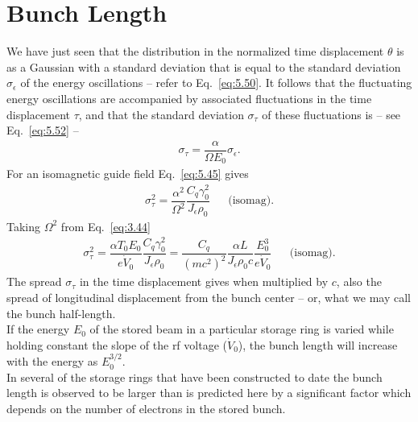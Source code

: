 \section{Bunch Length}\label{sec:5.4}

We have just seen that the distribution in the normalized time displacement $\theta$ is as a Gaussian with a standard deviation that is equal to the standard deviation $\sigma_\epsilon$ of the energy oscillations -- refer to Eq.~\eqref{eq:5.50}. It follows that the fluctuating energy oscillations are accompanied by associated fluctuations in the time displacement $\tau$, and that the standard deviation $\sigma_\tau$ of these fluctuations is -- see Eq.~\eqref{eq:5.52} --
\begin{align}
	\sigma_\tau = \dfrac{\alpha}{\Omega E_0} \sigma_\epsilon.
\end{align}
For an isomagnetic guide field Eq.~\eqref{eq:5.45} gives
\begin{align}
	\sigma_\tau^2 = \dfrac{\alpha^2}{\Omega^2} \dfrac{C_q \gamma_0^2}{J_\epsilon \rho_0} && \text{(isomag).}
\end{align}
Taking $\Omega^2$ from Eq.~\eqref{eq:3.44}
\begin{align}
	\sigma_\tau^2 = \dfrac{\alpha T_0 E_0}{e\dot{V}_0} \dfrac{C_q \gamma_0^2}{J_\epsilon \rho_0} = \dfrac{C_q}{(mc^2)^2} \dfrac{\alpha L}{J_\epsilon \rho_0 c} \dfrac{E_0^3}{e \dot{V}_0} && \text{(isomag).}
\end{align}
The spread $\sigma_\tau$ in the time displacement gives when multiplied by $c$, also the spread
of longitudinal displacement from the bunch center -- or, what we may call the bunch half-length.\\
If the energy $E_0$ of the stored beam in a particular storage ring is varied while holding constant the slope of the rf voltage ($\dot{V}_0$), the bunch length will increase with the energy as $E_0^{3/2}$.\\
In several of the storage rings that have been constructed to date the bunch length is observed to be larger than is predicted here by a significant factor which depends on the number of electrons
 in the stored bunch.
